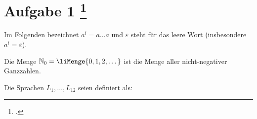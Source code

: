 \documentclass{lehramt-informatik-aufgabe}
\begin{document}
\def\z#1{
  \liZustandsMengenSammlungNr{#1}{
    {
      {0} {0}
      {1} {1}
      {2} {0,3}
      {3} {2}
      {4} {1,4}
      {5} {2,4}
    }
  }
}

\section{Aufgabe 1
\footcite{examen:66115:2021:03}}

Im Folgenden bezeichnet $a^i = a \dots a$ und $\varepsilon$ steht für
das leere Wort (\dh insbesondere $a^i = \varepsilon$).

Die Menge $\mathbb{N}_0 = \liMenge{0,1,2,\dots}$ ist die Menge aller
nicht-negativer Ganzzahlen.

Die Sprachen $L_1, \dots , L_{12}$ seien definiert als:
\end{document}
